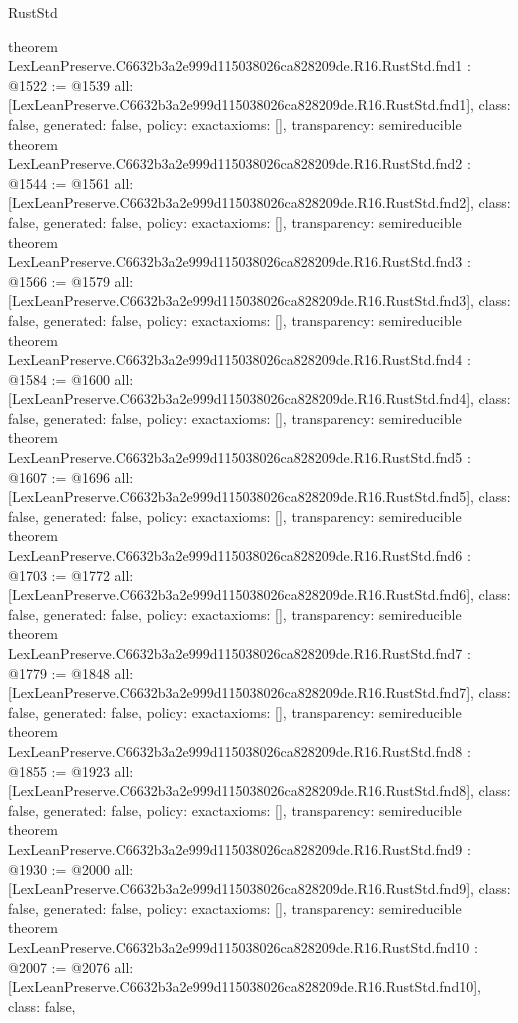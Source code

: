 \begin{lexlean}{RustStd}
\begin{coremodule}
{}
theorem LexLeanPreserve.C6632b3a2e999d115038026ca828209de.R16.RustStd.fnd1 : @1522 := @1539 {
  all: [LexLeanPreserve.C6632b3a2e999d115038026ca828209de.R16.RustStd.fnd1],
  class: false,
  generated: false,
  policy: exact{axioms: []},
  transparency: semireducible
}
theorem LexLeanPreserve.C6632b3a2e999d115038026ca828209de.R16.RustStd.fnd2 : @1544 := @1561 {
  all: [LexLeanPreserve.C6632b3a2e999d115038026ca828209de.R16.RustStd.fnd2],
  class: false,
  generated: false,
  policy: exact{axioms: []},
  transparency: semireducible
}
theorem LexLeanPreserve.C6632b3a2e999d115038026ca828209de.R16.RustStd.fnd3 : @1566 := @1579 {
  all: [LexLeanPreserve.C6632b3a2e999d115038026ca828209de.R16.RustStd.fnd3],
  class: false,
  generated: false,
  policy: exact{axioms: []},
  transparency: semireducible
}
theorem LexLeanPreserve.C6632b3a2e999d115038026ca828209de.R16.RustStd.fnd4 : @1584 := @1600 {
  all: [LexLeanPreserve.C6632b3a2e999d115038026ca828209de.R16.RustStd.fnd4],
  class: false,
  generated: false,
  policy: exact{axioms: []},
  transparency: semireducible
}
theorem LexLeanPreserve.C6632b3a2e999d115038026ca828209de.R16.RustStd.fnd5 : @1607 := @1696 {
  all: [LexLeanPreserve.C6632b3a2e999d115038026ca828209de.R16.RustStd.fnd5],
  class: false,
  generated: false,
  policy: exact{axioms: []},
  transparency: semireducible
}
theorem LexLeanPreserve.C6632b3a2e999d115038026ca828209de.R16.RustStd.fnd6 : @1703 := @1772 {
  all: [LexLeanPreserve.C6632b3a2e999d115038026ca828209de.R16.RustStd.fnd6],
  class: false,
  generated: false,
  policy: exact{axioms: []},
  transparency: semireducible
}
theorem LexLeanPreserve.C6632b3a2e999d115038026ca828209de.R16.RustStd.fnd7 : @1779 := @1848 {
  all: [LexLeanPreserve.C6632b3a2e999d115038026ca828209de.R16.RustStd.fnd7],
  class: false,
  generated: false,
  policy: exact{axioms: []},
  transparency: semireducible
}
theorem LexLeanPreserve.C6632b3a2e999d115038026ca828209de.R16.RustStd.fnd8 : @1855 := @1923 {
  all: [LexLeanPreserve.C6632b3a2e999d115038026ca828209de.R16.RustStd.fnd8],
  class: false,
  generated: false,
  policy: exact{axioms: []},
  transparency: semireducible
}
theorem LexLeanPreserve.C6632b3a2e999d115038026ca828209de.R16.RustStd.fnd9 : @1930 := @2000 {
  all: [LexLeanPreserve.C6632b3a2e999d115038026ca828209de.R16.RustStd.fnd9],
  class: false,
  generated: false,
  policy: exact{axioms: []},
  transparency: semireducible
}
theorem LexLeanPreserve.C6632b3a2e999d115038026ca828209de.R16.RustStd.fnd10 : @2007 := @2076 {
  all: [LexLeanPreserve.C6632b3a2e999d115038026ca828209de.R16.RustStd.fnd10],
  class: false,
}
\end{coremodule}
\end{lexlean}
